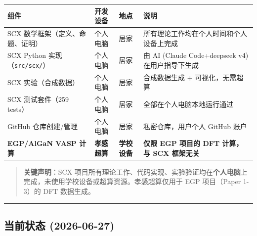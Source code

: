 \documentclass[
  12pt,
]{ctexart}
\begin{document}
\begin{longtable}[]{@{}
  >{\raggedright\arraybackslash}p{}
  >{\raggedright\arraybackslash}p{}
  >{\raggedright\arraybackslash}p{}
  >{\raggedright\arraybackslash}p{}@{}}
\toprule\noalign{}
\begin{minipage}[b]{\linewidth}\raggedright
组件
\end{minipage} & \begin{minipage}[b]{\linewidth}\raggedright
开发设备
\end{minipage} & \begin{minipage}[b]{\linewidth}\raggedright
地点
\end{minipage} & \begin{minipage}[b]{\linewidth}\raggedright
说明
\end{minipage} \\
\midrule\noalign{}
\endhead
\bottomrule\noalign{}
\endlastfoot
SCX 数学框架（定义、命题、证明） & 个人电脑 & 居家 &
所有理论工作均在个人时间和个人设备上完成 \\
SCX Python 实现（\texttt{src/scx/}） & 个人电脑 & 居家 & 由 AI (Claude
Code+deepseek v4) 在用户指导下生成 \\
SCX 实验（合成数据） & 个人电脑 & 居家 & 合成数据生成 +
可视化，无需超算 \\
SCX 测试套件（259 tests） & 个人电脑 & 居家 &
全部在个人电脑本地运行通过 \\
GitHub 仓库创建/管理 & 个人电脑 & 居家 & 私密仓库，用户个人 GitHub
账户 \\
\textbf{EGP/AlGaN VASP 计算} & \textbf{孝感超算} & \textbf{学校设备} &
\textbf{仅限 EGP 项目的 DFT 计算，与 SCX 框架无关} \\
\end{longtable}

\begin{quote}
\textbf{关键声明}：SCX
项目所有理论工作、代码实现、实验验证均在\textbf{个人电脑}上完成，未使用学校设备或超算资源。孝感超算仅用于
EGP 项目（Paper 1-3）的 DFT 数据生成。
\end{quote}

\begin{center}\rule{0.5\linewidth}{0.5pt}\end{center}

\subsection{当前状态
(2026-06-27)}\label{ux5f53ux524dux72b6ux6001-2026-06-27}
\end{document}
